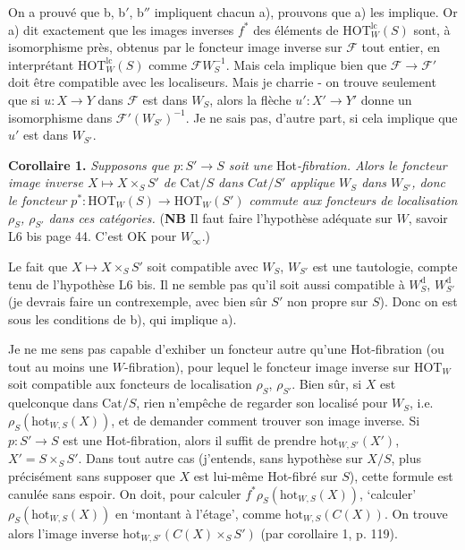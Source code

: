 \documentclass[11pt]{article}
\newcommand{\msp}[1]{\marginpar{\footnotesize [#1]}}
\newcommand{\HOT}{\mathrm{HOT}}
\newcommand{\hot}{\mathrm{hot}}
\newcommand{\Cat}{\mathrm{Cat}}
\begin{document}
On a prouvé que b, b$'$, b$''$ impliquent chacun a), prouvons que a) les implique. Or a) dit exactement que les images inverses $f^*$ des éléments de $\HOT_W^{\mathrm{lc}}(S)$
\msp{page 126}
sont, à isomorphisme près, obtenus par le foncteur image inverse sur $\mathcal{F}$ tout entier, en interprétant $\HOT_W^{\mathrm{lc}}(S)$ comme $\mathcal{F}W_S^{-1}$. Mais cela implique bien que $\mathcal{F} \longrightarrow \mathcal{F}'$ doit être compatible avec les localiseurs. Mais je charrie - on trouve seulement que si $u : X \longrightarrow Y$ dans $\mathcal{F}$ est dans $W_S$, alors la flèche $u' : X' \longrightarrow Y'$ donne un isomorphisme dans $\mathcal{F}'(W_{S'})^{-1}$. Je ne sais pas, d'autre part, si cela implique que $u'$ est dans $W_{S'}$.

\textbf{Corollaire 1.} \textit{Supposons que $p : S' \longrightarrow S$ soit une} Hot\textit{-fibration. Alors le foncteur image inverse $X \longmapsto X \times_S S'$ de} $\Cat/S$ \textit{dans $\mathit{Cat}/S'$ applique $W_S$ dans $W_{S'}$, donc le foncteur $p^* : \HOT_W(S) \longrightarrow \HOT_W(S')$ commute aux foncteurs de localisation $\rho_S$, $\rho_{S'}$ dans ces catégories.} (\textbf{NB} Il faut faire l'hypothèse adéquate sur $W$, savoir L6 bis page 44. C'est OK pour $W_\infty$.)

Le fait que $X \longmapsto X \times_S S'$ soit compatible avec $W_S$, $W_{S'}$ est une tautologie, compte tenu de l'hypothèse L6 bis. Il ne semble pas qu'il soit aussi compatible à $W_S^{\mathrm{d}}$, $W_{S'}^{\mathrm{d}}$ (je devrais faire un contrexemple, avec bien sûr $S'$ non propre sur $S$). Donc on est sous les conditions de b), qui implique a).

\msp{page 127}

Je ne me sens pas capable d'exhiber un foncteur autre qu'une Hot-fibration (ou tout au moins une $W$-fibration), pour lequel le foncteur image inverse sur $\HOT_W$ soit compatible aux foncteurs de localisation $\rho_S$, $\rho_{S'}$. Bien sûr, si $X$ est quelconque dans $\Cat/S$, rien n'empêche de regarder son localisé pour $W_S$, i.e. $\rho_S(\hot_{W,S}(X))$, et de demander comment trouver son image inverse. Si $p : S' \longrightarrow S$ est une Hot-fibration, alors il suffit de prendre $\hot_{W,S'}(X')$, $X' = S \times_S S'$. Dans tout autre cas (j'entends, sans hypothèse sur $X/S$, plus %
précisément sans supposer que $X$ est lui-même Hot-fibré sur $S$), cette formule est canulée sans espoir. On doit, pour calculer $f^*\rho_S(\hot_{W,S}(X))$, `calculer' $\rho_S(\hot_{W,S}(X))$ en `montant à l'étage', comme $\hot_{W,S}(C(X))$. On trouve alors l'image inverse $\hot_{W,S'}(C(X) \times_S S')$ (par corollaire 1, p. 119).
\end{document}
